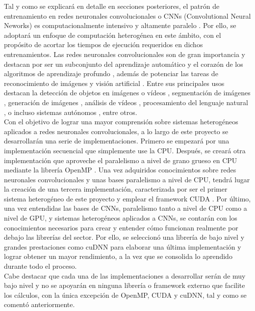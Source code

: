 Tal y como se explicará en detalle en secciones posteriores, el patrón de entrenamiento en redes neuronales convolucionales o CNNs (Convolutional Neural Neworks) \cite{CNN_definicion} es computacionalmente intensivo y altamente paralelo \cite{Programming_Massively}. Por ello, se adoptará un enfoque de computación heterogénea en este ámbito, con el propósito de acortar los tiempos de ejecución requeridos en dichos entrenamientos. Las redes neuronales convolucionales son de gran importancia y destacan por ser un subconjunto del aprendizaje automático \cite{Aprendizaje_automatico_definicion} y el corazón de los algoritmos de aprendizaje profundo \cite{Deep_learning_definicion}, además de potenciar las tareas de reconocimiento de imágenes \cite{image_recognition_CNN} y visión artificial \cite{computer_vision_definicion}. Entre sus principales usos destacan la detección de objetos en imágenes o vídeos \cite{object_detection_CNN}, segmentación de imágenes \cite{image_segmentation_CNN} , generación de imágenes \cite{generative_CNN}, análisis de vídeos \cite{video_analytics_CNN}, procesamiento del lenguaje natural \cite{NLP_CNN}, o incluso sistemas autónomos \cite{sitemas_autonomos_CNN}, entre otros. \\
Con el objetivo de lograr una mayor comprensión sobre sistemas heterogéneos aplicados a redes neuronales convolucionales, a lo largo de este proyecto se desarrollarán una serie de implementaciones. Primero se empezará por una implementación secuencial que simplemente use la CPU. Después, se creará otra implementación que aproveche el paralelismo a nivel de grano grueso en CPU mediante la librería OpenMP \cite{openmp_forum}. Una vez adquiridos conocimientos sobre redes neuronales convolucionales y unas bases paralelismo a nivel de CPU, tendrá lugar la creación de una tercera implementación, caracterizada por ser el primer sistema heterogéneo de este proyecto y emplear el framework CUDA \cite{cuda_forum}. Por último, una vez entendidas las bases de CNNs, paralelismo tanto a nivel de CPU como a nivel de GPU, y sistemas heterogéneos aplicados a CNNs, se contarán con los conocimientos necesarios para crear y entender cómo funcionan realmente por debajo las librerías del sector. Por ello, se seleccionó una librería de bajo nivel y grandes prestaciones como cuDNN \cite{cuDNN} para elaborar una última implementación y lograr obtener un mayor rendimiento, a la vez que se consolida lo aprendido durante todo el proceso. \\
Cabe destacar que cada una de las implementaciones a desarrollar serán de muy bajo nivel y no se apoyarán en ninguna librería o framework externo que facilite los cálculos, con la única excepción de OpenMP, CUDA y cuDNN, tal y como se comentó anteriormente. 


